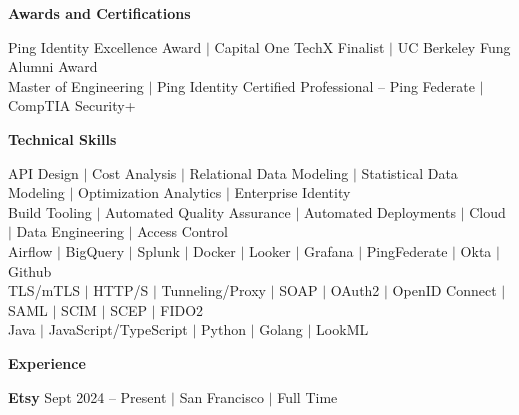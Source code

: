 \documentclass{article}
\begin{document}

\center\Large\textbf{Awards and Certifications}
\begin{minipage}{\textwidth}\center\normalsize
  \vspace{0.3cm}
  Ping Identity Excellence Award $|$ Capital One TechX Finalist $|$ UC Berkeley Fung Alumni Award \\
  \vspace{0.2cm}
  Master of Engineering $|$ Ping Identity Certified Professional -- Ping Federate $|$ CompTIA Security+
  \vspace{0.2cm}
\end{minipage}

\vspace{0.3cm}\center\Large\textbf{Technical Skills}

\begin{minipage}{\textwidth}\center\normalsize
  \vspace{0.3cm}
  API Design $|$ 
  Cost Analysis $|$
  Relational Data Modeling $|$
  Statistical Data Modeling $|$
  Optimization Analytics $|$
  Enterprise Identity \\
  \vspace{0.3cm}
  Build Tooling $|$
  Automated Quality Assurance $|$
  Automated Deployments $|$
  Cloud $|$
  Data Engineering $|$
  Access Control\\
  \vspace{0.3cm}
  Airflow $|$
  BigQuery $|$
  Splunk $|$
  Docker $|$
  Looker $|$
  Grafana $|$
  PingFederate $|$
  Okta $|$
  Github\\
  \vspace{0.3cm}
  TLS/mTLS $|$
  HTTP/S $|$
  Tunneling/Proxy $|$
  SOAP $|$
  OAuth2 $|$ 
  OpenID Connect $|$ 
  SAML $|$
  SCIM $|$
  SCEP $|$
  FIDO2\\
  \vspace{0.3cm}
  Java $|$
  JavaScript/TypeScript $|$
  Python $|$
  Golang $|$
  LookML\\
\end{minipage}

\vspace{0.5cm}\center\Large\textbf{Experience}
\vspace{0.2cm}\color{headercolor}

\flushleft\noindent\large\textbf{Etsy}\hfill\small{
  Sept 2024 -- Present $|$ San Francisco $|$ Full Time
}\color{black}
\end{document}
